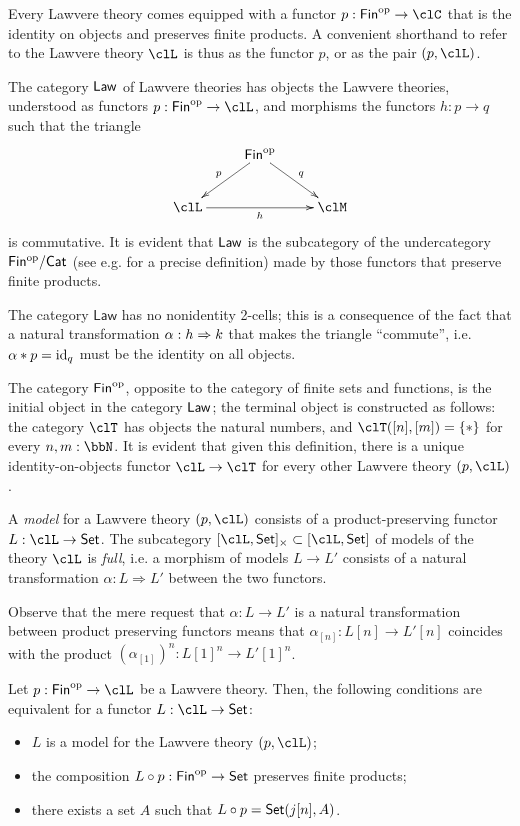 Every Lawvere theory comes equipped with a functor $p : \cate{Fin}^\op \to \clC$ that is the identity on objects and preserves finite products. A convenient shorthand to refer to the Lawvere theory $\clL$ is thus as the functor $p$, or as the pair $(p,\clL)$.
\begin{definition}
	The category $\mathsf{Law}$ of Lawvere theories has objects the Lawvere theories, understood as functors $p : \cate{Fin}^\op \to \clL$, and morphisms the functors $h :  p\to q$ such that the triangle
	\[\xymatrix{
			& \cate{Fin}^\op \ar[dr]^q \ar[dl]_p & \\
			\clL \ar[rr]_h && \clM
		}\]
	is commutative. It is evident that $\mathsf{Law}$ is the subcategory of the undercategory $\mathsf{Fin^{\text{op}}}/\mathsf{Cat}$ (see e.g. \cite[I.6]{McL}for a precise definition) made by those functors that preserve finite products.
\end{definition}
\begin{remark}
	The category $\textsf{Law}$ has no nonidentity 2-cells; this is a consequence of the fact that a natural transformation $\alpha : h \Rightarrow k$ that makes the triangle ``commute'', i.e. $\alpha * p = \text{id}_q$ must be the identity on all objects.
\end{remark}
\begin{example}
	The category $\mathsf{Fin}^{\text{op}}$, opposite to the category of finite sets and functions, is the initial object in the category  $\mathsf{Law}$; the terminal object is constructed as follows: the category $\clT$ has objects the natural numbers, and $\clT([n],[m])=\{*\}$ for every $n,m: \bbN$. It is evident that given this definition, there is a unique identity-on-objects functor $\clL \to \clT$ for every other Lawvere theory $(p,\clL)$.
\end{example}
\begin{definition}
	A \emph{model} for a Lawvere theory $(p ,\clL)$ consists of a product-preserving functor $L : \clL \to \Set$. The subcategory $[\clL,\Set]_\times \subset [\clL, \Set]$ of models of the theory $\clL$ is \emph{full}, i.e. a morphism of models $L \to L'$ consists of a natural transformation $\alpha : L \Rightarrow L'$ between the two functors.
\end{definition}
Observe that the mere request that $\alpha : L \to L'$ is a natural transformation between product preserving functors means that $\alpha_{[n]} : L[n] \to L'[n]$ coincides with the product $(\alpha_{[1]})^n : L[1]^n \to L'[1]^n$.
\begin{proposition}
	Let $p : \cate{Fin}^\op\to \clL$ be a Lawvere theory. Then, the following conditions are equivalent for a functor $L : \clL \to \Set$:
	\begin{itemize}
		\item $L$ is a model for the Lawvere theory $(p,\clL)$;
		\item the composition $L\circ p : \mathsf{Fin}^{\text{op}} \to \mathsf{Set}$ preserves finite products;
		\item there exists a set $A$ such that $L\circ p = \mathsf{Set}(j[n],A)$.
	\end{itemize}
\end{proposition}
